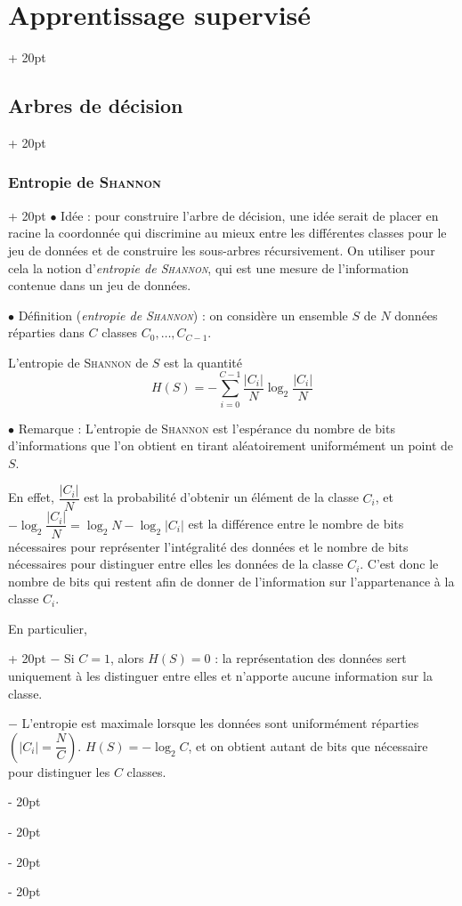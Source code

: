 \documentclass[a4paper, 12pt, twoside]{article}
\newcommand{\lr}[1]{\left( #1 \right)}
\newcommand{\abs}[1]{\left\lvert #1 \right\rvert}
\newcommand{\ind}[1][20pt]{\advance\leftskip + #1}
\newcommand{\deind}[1][20pt]{\advance\leftskip - #1}
\newenvironment{indt}[2][20pt]{#2 \par \ind[#1]}{\par \deind} %
\begin{document}
\begin{indt}{\section{Apprentissage supervisé}}
\begin{indt}{\subsection{Arbres de décision}}
            \begin{indt}{\subsubsection{Entropie de \textsc{Shannon}}}
                $\bullet$ Idée : pour construire l'arbre de décision, une idée serait de placer en racine la coordonnée qui discrimine au mieux entre les différentes classes pour le jeu de données et de construire les sous-arbres récursivement.
                On utiliser pour cela la notion d'\emph{entropie de \textsc{Shannon}}, qui est une mesure de l'information contenue dans un jeu de données.

                \vspace{12pt}
                
                $\bullet$ Définition (\textit{entropie de \textsc{Shannon}}) :
                on considère un ensemble $S$ de $N$ données réparties dans $C$ classes $C_0, \ldots, C_{C - 1}$.

                L'entropie de \textsc{Shannon} de $S$ est la quantité
                \[
                    H(S) = -\sum_{i = 0}^{C - 1} \dfrac{\abs{C_i}}{N} \log_2 \dfrac{\abs{C_i}}{N}
                \]

                \vspace{12pt}
                
                $\bullet$ Remarque : L'entropie de \textsc{Shannon} est l'espérance du nombre de bits d'informations que l'on obtient en tirant aléatoirement uniformément un point de $S$.

                En effet, $\dfrac{\abs{C_i}} N$ est la probabilité d'obtenir un élément de la classe $C_i$, et $-\log_2 \dfrac{\abs{C_i}}N = \log_2 N - \log_2 \abs{C_i}$ est la différence entre le nombre de bits nécessaires pour représenter l'intégralité des données et le nombre de bits nécessaires pour distinguer entre elles les données de la classe $C_i$.
                C'est donc le nombre de bits qui restent afin de donner de l'information sur l'appartenance à la classe $C_i$.

                \begin{indt}{En particulier,}
                    $-$ Si $C = 1$, alors $H(S) = 0$ : la représentation des données sert uniquement à les distinguer entre elles et n'apporte aucune information sur la classe.
                    
                    $-$ L'entropie est maximale lorsque les données sont uniformément réparties $\lr{\abs{C_i} = \dfrac N C}$.
                    $H(S) = -\log_2 C$, et on obtient autant de bits que nécessaire pour distinguer les $C$ classes.
                \end{indt}


\end{indt}
\end{indt}
\end{indt}
\end{document}
